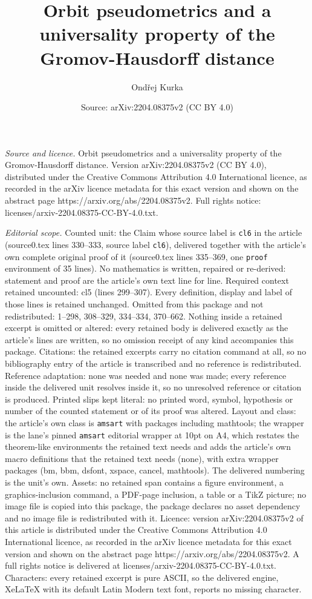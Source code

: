 \documentclass[10pt,a4paper]{amsart}
\title[Orbit pseudometrics and a universality property of the Gromo]{Orbit pseudometrics and a universality property of the Gromov-Hausdorff distance}
\author{Ond\v{r}ej Kurka}
\date{Source: arXiv:2204.08375v2 (CC BY 4.0)}
\begin{document}
\maketitle

\noindent\emph{Source and licence.} Orbit pseudometrics and a universality property of the Gromov-Hausdorff distance. Version arXiv:2204.08375v2 (CC BY 4.0), distributed under the Creative Commons Attribution 4.0 International licence, as recorded in the arXiv licence metadata for this exact version and shown on the abstract page https://arxiv.org/abs/2204.08375v2. Full rights notice: licenses/arxiv-2204.08375-CC-BY-4.0.txt.\par\smallskip

\noindent\textit{Editorial scope.} Counted unit: the Claim whose source label is \texttt{cl6} in the article (source0.tex lines 330--333, source label \texttt{cl6}), delivered together with the article's own complete original proof of it (source0.tex lines 335--369, one \texttt{proof} environment of 35 lines). No mathematics is written, repaired or re-derived: statement and proof are the article's own text line for line. Required context retained uncounted: cl5 (lines 299--307). Every definition, display and label of those lines is retained unchanged. Omitted from this package and not redistributed: 1--298, 308--329, 334--334, 370--662. Nothing inside a retained excerpt is omitted or altered: every retained body is delivered exactly as the article's lines are written, so no omission receipt of any kind accompanies this package. Citations: the retained excerpts carry no citation command at all, so no bibliography entry of the article is transcribed and no reference is redistributed. Reference adaptation: none was needed and none was made; every reference inside the delivered unit resolves inside it, so no unresolved reference or citation is produced. Printed slips kept literal: no printed word, symbol, hypothesis or number of the counted statement or of its proof was altered. Layout and class: the article's own class is \texttt{amsart} with packages including mathtools; the wrapper is the lane's pinned \texttt{amsart} editorial wrapper at 10pt on A4, which restates the theorem-like environments the retained text needs and adds the article's own macro definitions that the retained text needs (none), with extra wrapper packages (bm, bbm, dsfont, xspace, cancel, mathtools). The delivered numbering is the unit's own. Assets: no retained span contains a figure environment, a graphics-inclusion command, a PDF-page inclusion, a table or a TikZ picture; no image file is copied into this package, the package declares no asset dependency and no image file is redistributed with it. Licence: version arXiv:2204.08375v2 of this article is distributed under the Creative Commons Attribution 4.0 International licence, as recorded in the arXiv licence metadata for this exact version and shown on the abstract page https://arxiv.org/abs/2204.08375v2. A full rights notice is delivered at licenses/arxiv-2204.08375-CC-BY-4.0.txt. Characters: every retained excerpt is pure ASCII, so the delivered engine, XeLaTeX with its default Latin Modern text font, reports no missing character.
\end{document}
